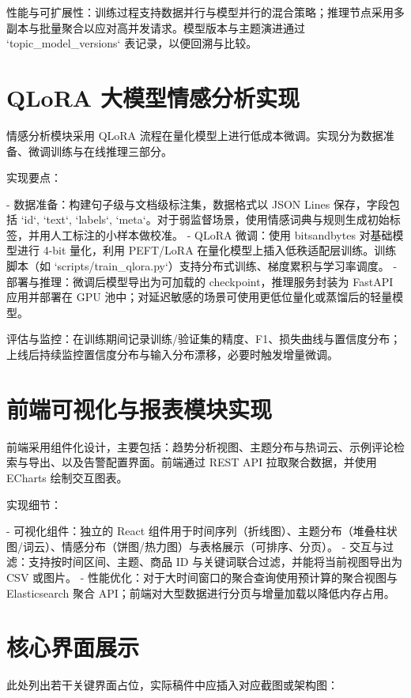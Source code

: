 性能与可扩展性：训练过程支持数据并行与模型并行的混合策略；推理节点采用多副本与批量聚合以应对高并发请求。模型版本与主题演进通过 `topic\_model\_versions` 表记录，以便回溯与比较。

\section{QLoRA 大模型情感分析实现}
\label{sec:impl_qlora}

情感分析模块采用 QLoRA 流程在量化模型上进行低成本微调。实现分为数据准备、微调训练与在线推理三部分。

实现要点：

- 数据准备：构建句子级与文档级标注集，数据格式以 JSON Lines 保存，字段包括 `id`, `text`, `labels`, `meta`。对于弱监督场景，使用情感词典与规则生成初始标签，并用人工标注的小样本做校准。 
- QLoRA 微调：使用 bitsandbytes 对基础模型进行 4-bit 量化，利用 PEFT/LoRA 在量化模型上插入低秩适配层训练。训练脚本（如 `scripts/train\_qlora.py`）支持分布式训练、梯度累积与学习率调度。 
- 部署与推理：微调后模型导出为可加载的 checkpoint，推理服务封装为 FastAPI 应用并部署在 GPU 池中；对延迟敏感的场景可使用更低位量化或蒸馏后的轻量模型。 

评估与监控：在训练期间记录训练/验证集的精度、F1、损失曲线与置信度分布；上线后持续监控置信度分布与输入分布漂移，必要时触发增量微调。

\section{前端可视化与报表模块实现}
\label{sec:impl_frontend}

前端采用组件化设计，主要包括：趋势分析视图、主题分布与热词云、示例评论检索与导出、以及告警配置界面。前端通过 REST API 拉取聚合数据，并使用 ECharts 绘制交互图表。

实现细节：

- 可视化组件：独立的 React 组件用于时间序列（折线图）、主题分布（堆叠柱状图/词云）、情感分布（饼图/热力图）与表格展示（可排序、分页）。
- 交互与过滤：支持按时间区间、主题、商品 ID 与关键词联合过滤，并能将当前视图导出为 CSV 或图片。 
- 性能优化：对于大时间窗口的聚合查询使用预计算的聚合视图与 Elasticsearch 聚合 API；前端对大型数据进行分页与增量加载以降低内存占用。 

\section{核心界面展示}
\label{sec:ui_showcase}

此处列出若干关键界面占位，实际稿件中应插入对应截图或架构图：

